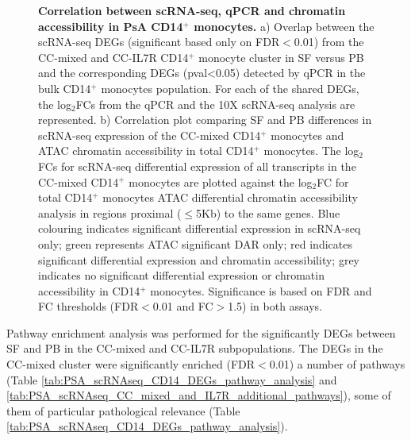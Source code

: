 \begin{figure}[H]
\caption[Correlation between scRNA-seq, qPCR and chromatin accessibility in PsA CD14$^+$ monocytes.]{\textbf{Correlation between scRNA-seq, qPCR and chromatin accessibility in PsA CD14$^+$ monocytes.} a) Overlap between the scRNA-seq DEGs (significant based only on FDR$<$0.01) from the CC-mixed and CC-IL7R CD14$^+$ monocyte cluster in SF versus PB and the corresponding DEGs (pval<0.05) detected by qPCR in the bulk CD14$^+$ monocytes population. For each of the shared DEGs, the log$_2$FCs from the qPCR and the 10X scRNA-seq analysis are represented. b) Correlation plot comparing SF and PB differences in scRNA-seq expression of the CC-mixed CD14$^+$ monocytes and ATAC chromatin accessibility in total CD14$^+$ monocytes. The log$_2$FCs for scRNA-seq differential expression of all transcripts in the CC-mixed CD14$^+$ monocytes are plotted against the log$_2$FC for total CD14$^+$ monocytes ATAC differential chromatin accessibility analysis in regions proximal ($\leq$5Kb) to the same genes. Blue colouring indicates significant differential expression in scRNA-seq only; green represents ATAC significant DAR only; red indicates significant differential expression and chromatin accessibility; grey indicates no significant differential expression or chromatin accessibility in CD14$^+$ monocytes. Significance is based on FDR and FC thresholds (FDR$<$0.01 and FC$>$1.5) in both assays.}
\label{figure:PsA_scRNAseq_qPCR_ATAC_correlation}
\end{figure}




Pathway enrichment analysis was performed for the significantly DEGs between SF and PB in the CC-mixed and CC-IL7R subpopulations. The DEGs in the CC-mixed cluster were significantly enriched (FDR$<$0.01) a number of pathways (Table \ref{tab:PSA_scRNAseq_CD14_DEGs_pathway_analysis} and \ref{tab:PSA_scRNAseq_CC_mixed_and_IL7R_additional_pathways}), some of them of particular pathological relevance (Table \ref{tab:PSA_scRNAseq_CD14_DEGs_pathway_analysis}). 

